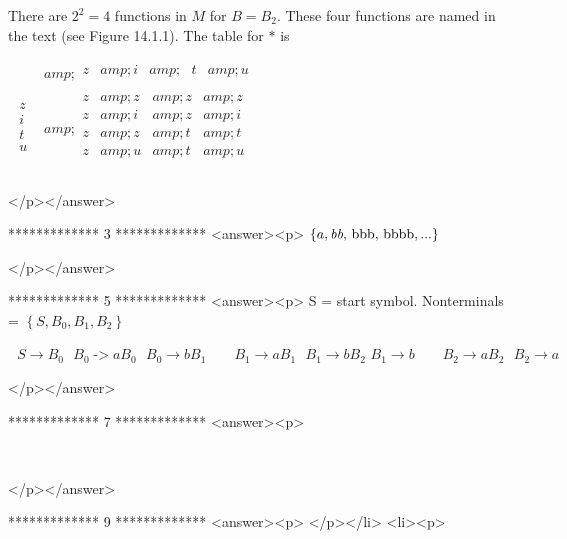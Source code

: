 There are \(2^2= 4\) functions in \(M\) for \(B = B _2\). These four functions are named in the text (see Figure 14.1.1). The table for \(*\) is



          \(\begin{array}{c|c}
   &amp; 
\begin{array}{cccc}
 z &amp;  i &amp; \text{  }t &amp;  u \\
\end{array}
 \\
\hline
 
\begin{array}{c}
 z \\
 i \\
 t \\
 u \\
\end{array}
 &amp; 
\begin{array}{cccc}
 z &amp; z &amp; z &amp; z \\
 z &amp; i &amp; z &amp; i \\
 z &amp; z &amp; t &amp; t \\
 z &amp; u &amp; t &amp; u \\
\end{array}
 \\
\end{array}\)

</p></answer>


*************
3
*************
<answer><p>   \(\{a,\text{\textit{$ $}}\text{\textit{bb}, \text{bbb}, \text{bbbb}}, . . .\}\)

</p></answer>


*************
5
*************
<answer><p>    S = start symbol. Nonterminals = \(\left\{S, B_0 , B_1, B_2\right\}\)



\(\text{          }S\to B_0\text{        }B_0\text{-$>$}a B_0\text{    }B_0\to b B_1\quad \quad B_1\to a B_1\text{       }B_1\to b B_2\text{
     }B_1\to b\quad \quad B_2 \to a B_2\text{      }B_2\to a\)

</p></answer>


*************
7
*************
<answer><p> 

\begin{doublespace}
\noindent\(\)
\end{doublespace}

</p></answer>


*************
9
*************
<answer><p> </p></li>
<li><p>

